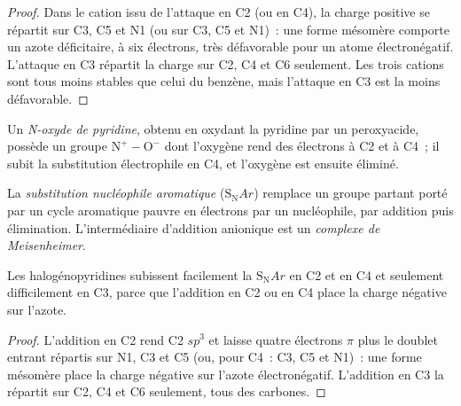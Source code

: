 \begin{proof}
Dans le cation issu de l'attaque en C2 (ou en C4), la charge positive se
répartit sur C3, C5 et N1 (ou sur C3, C5 et N1)~: une forme mésomère
comporte un azote déficitaire, à six électrons, très défavorable pour un
atome électronégatif. L'attaque en C3 répartit la charge sur C2, C4 et C6
seulement. Les trois cations sont tous moins stables que celui du benzène,
mais l'attaque en C3 est la moins défavorable.
\end{proof}

\begin{definition}\label{def:b3:heterocycles:n-oxide}
Un \emph{N-oxyde de pyridine}, obtenu en oxydant la pyridine
par un peroxyacide, possède un groupe $\mathrm{N^+{-}O^-}$ dont l'oxygène rend des électrons à C2
et à C4~; il subit la substitution électrophile en C4, et l'oxygène est
ensuite éliminé.
\end{definition}

\begin{definition}\label{def:b3:heterocycles:snar}
La \emph{substitution nucléophile aromatique}
($\mathrm S_\mathrm NAr$) remplace un groupe partant porté par un cycle aromatique pauvre en
électrons par un nucléophile, par addition puis élimination. L'intermédiaire
d'addition anionique est un \emph{complexe de Meisenheimer}.
\end{definition}

\begin{proposition}\label{prop:b3:heterocycles:snar-positions}
Les halogénopyridines subissent facilement la $\mathrm S_\mathrm NAr$ en C2 et en C4 et seulement difficilement en C3,
parce que l'addition en C2 ou en C4 place la charge négative sur l'azote.
\end{proposition}

\begin{proof}
L'addition en C2 rend C2 $sp^3$ et laisse quatre électrons $\pi$ plus le doublet entrant
répartis sur N1, C3 et C5 (ou, pour C4~: C3, C5 et N1)~: une forme mésomère
place la charge négative sur l'azote électronégatif. L'addition en C3 la
répartit sur C2, C4 et C6 seulement, tous des carbones.
\end{proof}

